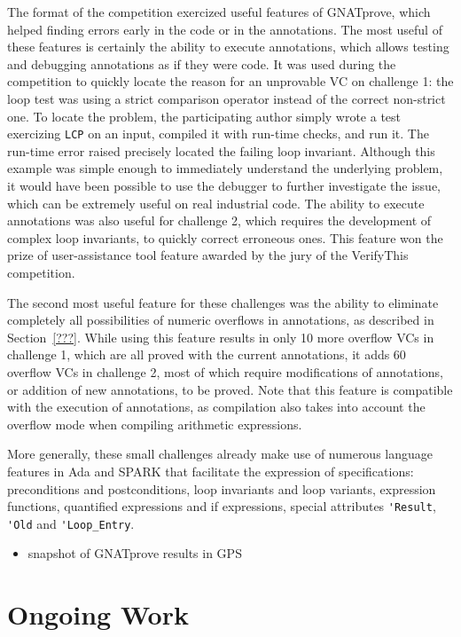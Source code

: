 \documentclass[sttt,draft]{svjour}
\newcommand{\gnatprove}{GNATprove\xspace}
\begin{document}
The format of the competition exercized useful features of \gnatprove, which
helped finding errors early in the code or in the annotations. The most useful
of these features is certainly the ability to execute annotations, which allows
testing and debugging annotations as if they were code. It was used during the
competition to quickly locate the reason for an unprovable VC on challenge 1:
the loop test was using a strict comparison operator instead of the correct
non-strict one. To locate the problem, the participating author simply wrote a
test exercizing \verb|LCP| on an input, compiled it with run-time checks, and
run it. The run-time error raised precisely located the failing loop
invariant. Although this example was simple enough to immediately understand
the underlying problem, it would have been possible to use the debugger to
further investigate the issue, which can be extremely useful on real industrial
code. The ability to execute annotations was also useful for challenge 2, which
requires the development of complex loop invariants, to quickly correct
erroneous ones. This feature won the prize of user-assistance tool feature
awarded by the jury of the VerifyThis competition.

The second most useful feature for these challenges was the ability to
eliminate completely all possibilities of numeric overflows in annotations, as
described in Section~\ref{???}. While using this feature results in only 10
more overflow VCs in challenge 1, which are all proved with the current
annotations, it adds 60 overflow VCs in challenge 2, most of which require
modifications of annotations, or addition of new annotations, to be
proved. Note that this feature is compatible with the execution of annotations,
as compilation also takes into account the overflow mode when compiling
arithmetic expressions.

More generally, these small challenges already make use of numerous language
features in Ada and SPARK that facilitate the expression of specifications:
preconditions and postconditions, loop invariants and loop variants, expression
functions, quantified expressions and if expressions, special attributes
\verb|'Result|, \verb|'Old| and \verb|'Loop_Entry|.

\begin{itemize}
\item snapshot of GNATprove results in GPS
\end{itemize}

\section{Ongoing Work}
\label{ongoing}
\end{document}

